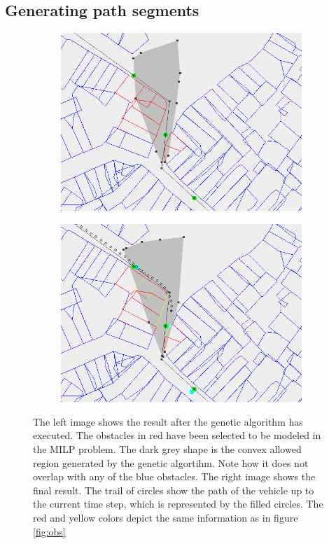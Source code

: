 \subsection{Generating path segments}
\begin{figure}[!t]
    \centering
    \begin{subfigure}[t]{0.47\textwidth}
        \includegraphics[width=\textwidth]{img/pre3}
    \end{subfigure}
    \hfil
    \begin{subfigure}[t]{0.47\textwidth}
        \includegraphics[width=\textwidth]{img/pre4}
    \end{subfigure}
    \caption{The left image shows the result after the genetic algorithm has executed. The obstacles in red have been selected to be modeled in the MILP problem. The dark grey shape is the convex allowed region generated by the genetic algortihm. Note how it does not overlap with any of the blue obstacles. The right image shows the final result. The trail of circles show the path of the vehicle up to the current time step, which is represented by the filled circles. The red and yellow colors depict the same information as in figure \ref{fig:obs}}\label{fig:pre-3-4}
\end{figure}

